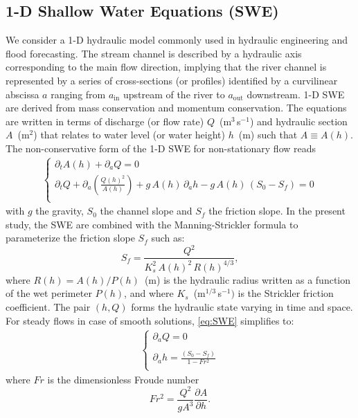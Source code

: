 \subsection{1-D Shallow Water Equations (SWE)}

We consider a 1-D hydraulic model commonly used in hydraulic engineering and flood forecasting. The stream channel is described by a hydraulic axis corresponding to the main flow direction, implying that the river channel is represented by a series of cross-sections (or profiles) identified by a curvilinear abscissa $a$ ranging from $a_{\text{in}}$ upstream of the river to $a_{\text{out}}$ downstream. 1-D SWE are derived from mass conservation and momentum conservation. The equations are written in terms of discharge (or flow rate) $Q$~(m$^3$\,s$^{-1}$) and hydraulic section $A$~(m$^2$) that relates to water level (or water height) $h$~(m) such that $A \equiv A(h)$. The non-conservative form of the 1-D SWE for non-stationary flow reads~\citep{thual2010} 
\begin{eqnarray}
\left\{
\begin{array}{l}
\displaystyle{\partial_t A(h) + \partial_a Q=0} \\
\displaystyle{\partial_t Q +  \partial_a\left(\frac{Q(h)^2}{A(h)}\right) + g\,A(h)\,\partial_a h - g\,A(h)\,(S_0-S_f) = 0} \\
\end{array}
\right.
\label{eq:SWE}
\end{eqnarray}
with $g$ the gravity, $S_0$ the channel slope and $S_f$ the friction slope. In the present study, the SWE are combined with the Manning-Strickler formula to parameterize the friction slope $S_f$ such as:
\begin{equation}
S_f = \frac{Q^2}{K_s^2\,A(h)^{2}\,R(h)^{4/3}},   
\label{eq:friction}
\end{equation}
where $R(h) =A(h)/P(h)$~(m) is the hydraulic radius written as a function of the wet perimeter $P(h)$, and where $K_s$~(m$^{1/3}$\,s$^{-1})$ is the Strickler friction coefficient. The pair $(h,Q)$ forms the hydraulic state varying in time and space. For steady flows in case of smooth solutions, \cref{eq:SWE} simplifies to: 
\begin{eqnarray}
\left\{
\begin{array}{l}
\displaystyle{\partial_a Q=0} \\ \\
\displaystyle{\partial_a h =\frac{(S_0-S_f)}{1-Fr^ 2}}\\
\end{array}
\right.
\label{eq:backwater}
\end{eqnarray}
where $Fr$ is the dimensionless Froude number 
\begin{equation}
Fr^2 = \frac{Q^2}{gA^3} \frac{\partial{A}}{\partial{h}}.
\label{eq:froude}
\end{equation}

